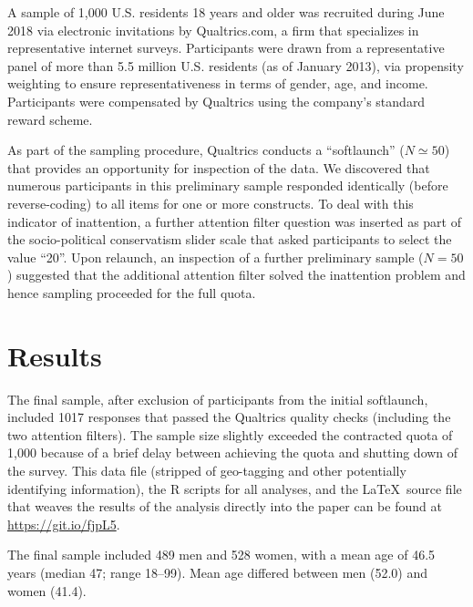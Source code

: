\documentclass[fignum,man]{apa}\usepackage[]{graphicx}\usepackage[]{color}
\begin{document}
A sample of 1,000 U.S. residents 18 years and older was recruited during June 2018
via electronic invitations by Qualtrics.com, a firm that
specializes in representative internet surveys. 
Participants were
drawn from a representative panel of more than 5.5 million
U.S. residents (as of January 2013), via propensity weighting to
ensure representativeness in terms of gender, age, and income.
Participants were compensated by Qualtrics using the company's
standard reward scheme.

As part of the sampling procedure, Qualtrics conducts a
``softlaunch'' ($N \simeq 50$) that provides an opportunity for
inspection of the data. We discovered that numerous participants 
in this preliminary sample 
responded identically (before reverse-coding)
to all items for one or more constructs. 
To deal with this indicator
of inattention, a further attention filter question was
inserted as part of the socio-political conservatism slider scale that asked
participants to select the value ``20''. Upon relaunch, 
an inspection of a further preliminary sample ($N=50$) suggested
that the additional attention filter
solved the inattention problem and hence sampling proceeded
for the full quota.

\section{Results}
The final sample, after exclusion of participants from 
the initial softlaunch, included 1017 responses that passed the Qualtrics
quality checks (including the two attention filters). The sample size
slightly exceeded the contracted quota of 1,000 because of a brief delay
between achieving the quota and shutting down of the survey.
This data file (stripped of geo-tagging and other potentially identifying 
information), 
the R scripts for all analyses, and the \LaTeX ~source file 
that weaves the results of the analysis directly into the paper can be found 
at \url{https://git.io/fjpL5}. 

The final sample included 489 men and 528 women, with a mean age of 
46.5 years
 (median 47;
range 18--99). 
Mean age differed between men (52.0) and women (41.4). 
\end{document}
